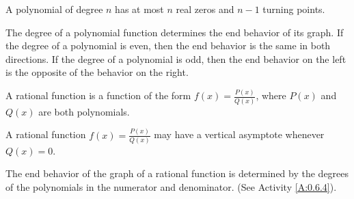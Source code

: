 




\begin{summary}
	\item A polynomial of degree $n$ has at most $n$ real zeros and $n-1$ turning points.
	\item The degree of a polynomial function determines the end behavior of its graph.  If the degree of a polynomial is even, then the end behavior is the same in both directions.  If the degree of a polynomial is odd, then the end behavior on the left is the opposite of the behavior on the right.
	\item A rational function is a function of the form $f(x)=\frac{P(x)}{Q(x)}$, where $P(x)$ and $Q(x)$ are both polynomials.
	\item A rational function $f(x)=\frac{P(x)}{Q(x)}$ may have a vertical asymptote whenever $Q(x)=0$.
	\item The end behavior of the graph of a rational function is determined by the degrees of the polynomials in the numerator and denominator. (See Activity \ref{A:0.6.4}).
\end{summary}



\clearpage
